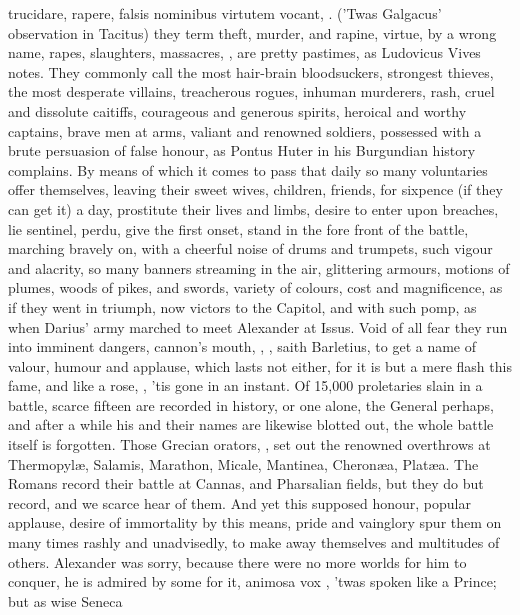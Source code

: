 {{trucidare, rapere, falsis nominibus virtutem vocant}, \etc{}. ('Twas
Galgacus' observation in Tacitus) they term theft, murder, and rapine,
virtue, by a wrong name, rapes, slaughters, massacres, \etc{} , are pretty pastimes, as Ludovicus Vives notes. They
commonly call the most hair-brain bloodsuckers, strongest thieves, the
most desperate villains, treacherous rogues, inhuman murderers, rash,
cruel and dissolute caitiffs, courageous and generous spirits, heroical
and worthy captains, brave men at arms, valiant and renowned
soldiers, possessed with a brute persuasion of false honour, as Pontus
Huter in his Burgundian history complains. By means of which it comes
to pass that daily so many voluntaries offer themselves, leaving their
sweet wives, children, friends, for sixpence (if they can get it) a
day, prostitute their lives and limbs, desire to enter upon breaches,
lie sentinel, perdu, give the first onset, stand in the fore front of
the battle, marching bravely on, with a cheerful noise of drums and
trumpets, such vigour and alacrity, so many banners streaming in the
air, glittering armours, motions of plumes, woods of pikes, and swords,
variety of colours, cost and magnificence, as if they went in triumph,
now victors to the Capitol, and with such pomp, as when Darius' army
marched to meet Alexander at Issus. Void of all fear they run into
imminent dangers, cannon's mouth, \etc{}, , saith Barletius, to get a name of valour, humour
and applause, which lasts not either, for it is but a mere flash this
fame, and like a rose, , 'tis gone in an
instant. Of 15,000 proletaries slain in a battle, scarce fifteen are
recorded in history, or one alone, the General perhaps, and after a
while his and their names are likewise blotted out, the whole battle
itself is forgotten. Those Grecian orators, , set out the renowned overthrows at Thermopyl\ae{}, Salamis,
Marathon, Micale, Mantinea, Cheron\ae{}a, Plat\ae{}a. The Romans record their
battle at Cannas, and Pharsalian fields, but they do but record, and we
scarce hear of them. And yet this supposed honour, popular applause,
desire of immortality by this means, pride and vainglory spur them on
many times rashly and unadvisedly, to make away themselves and
multitudes of others. Alexander was sorry, because there were no more
worlds for him to conquer, he is admired by some for it, animosa vox
, 'twas spoken like a Prince; but as wise Seneca
}
